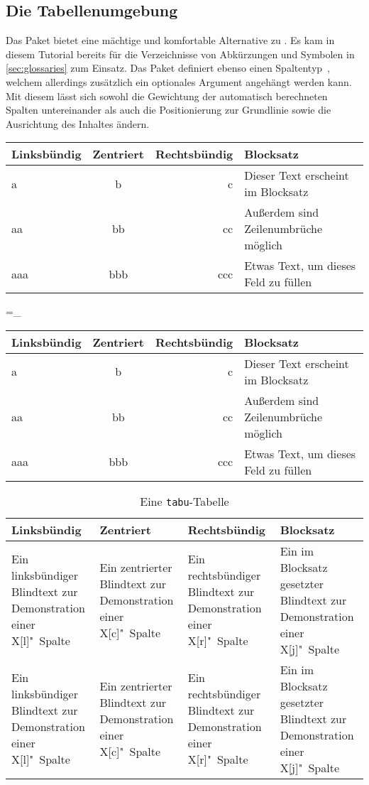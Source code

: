 \documentclass[%
  english,ngerman,%
  geometry=no,DIV=12,automark,%
]{tudscrartcl}
\begin{document}
\subsection{Die Tabellenumgebung }
Das Paket  bietet eine mächtige und komfortable Alternative zu 
. Es kam in diesem Tutorial bereits für die Verzeichnisse von 
Abkürzungen und Symbolen in \autoref{sec:glossaries} zum Einsatz. Das Paket 
definiert ebenso einen Spaltentyp~, welchem allerdings zusätzlich ein 
optionales Argument angehängt werden kann. Mit diesem lässt sich sowohl die 
Gewichtung der automatisch berechneten Spalten untereinander als auch die 
Positionierung zur Grundlinie sowie die Ausrichtung des Inhaltes ändern.
%

\begin{Hint}
\begin{tabu}{lcrp{40mm}}
\toprule
\textbf{Linksbündig} & \textbf{Zentriert} & 
\textbf{Rechtsbündig} & \textbf{Blocksatz} \tabularnewline
\midrule
a   & b   & c   & Dieser Text erscheint im Blocksatz \tabularnewline
aa  & bb  & cc  & Außerdem sind Zeilenumbrüche möglich\tabularnewline
aaa & bbb & ccc & Etwas Text, um dieses Feld zu füllen\tabularnewline
\bottomrule
\end{tabu}
\end{Hint}

\tabulinesep=_\dp\strutbox

\begin{Hint}
\begin{tabu}{lcrp{40mm}}
\toprule
\textbf{Linksbündig} & \textbf{Zentriert} & 
\textbf{Rechtsbündig} & \textbf{Blocksatz} \tabularnewline
\midrule
a   & b   & c   & Dieser Text erscheint im Blocksatz \tabularnewline
aa  & bb  & cc  & Außerdem sind Zeilenumbrüche möglich\tabularnewline
aaa & bbb & ccc & Etwas Text, um dieses Feld zu füllen\tabularnewline
\bottomrule
\end{tabu}
\end{Hint}

\begin{Excerpt*}
\begin{table}
\caption{Eine \texttt{tabu}-Tabelle}\label{tab:tabu}
\begin{tabu} to 
\toprule
\textbf{Linksbündig} & \textbf{Zentriert} & 
\textbf{Rechtsbündig} & \textbf{Blocksatz} \tabularnewline
\midrule
Ein linksbündiger Blindtext zur Demonstration einer X[l]"~Spalte &
Ein zentrierter Blindtext zur Demonstration einer X[c]"~Spalte &
Ein rechtsbündiger Blindtext zur Demonstration einer X[r]"~Spalte &
Ein im Blocksatz gesetzter Blindtext zur Demonstration einer X[j]"~Spalte
\tabularnewline
Ein linksbündiger Blindtext zur Demonstration einer X[l]"~Spalte &
Ein zentrierter Blindtext zur Demonstration einer X[c]"~Spalte &
Ein rechtsbündiger Blindtext zur Demonstration einer X[r]"~Spalte &
Ein im Blocksatz gesetzter Blindtext zur Demonstration einer X[j]"~Spalte
\tabularnewline
\bottomrule
\end{tabu}
\end{table}
\end{Excerpt*}
\InputExcerpt
\end{document}
